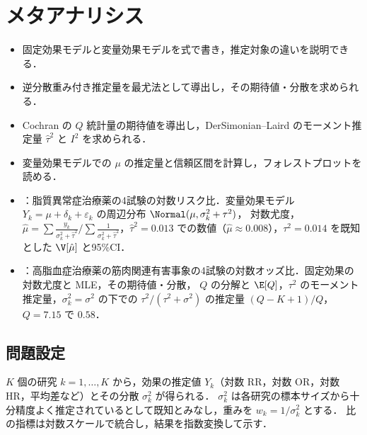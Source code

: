 \chapter{メタアナリシス}\label{ch:15}

\begin{goalbox}
\begin{itemize}
\item 固定効果モデルと変量効果モデルを式で書き，推定対象の違いを説明できる．
\item 逆分散重み付き推定量を最尤法として導出し，その期待値・分散を求められる．
\item Cochran の $Q$ 統計量の期待値を導出し，DerSimonian--Laird のモーメント推定量 $\hat\tau^2$ と $I^2$ を求められる．
\item 変量効果モデルでの $\mu$ の推定量と信頼区間を計算し，フォレストプロットを読める．
\end{itemize}
\end{goalbox}

\begin{exambox}
\begin{itemize}
\item {}：脂質異常症治療薬の4試験の対数リスク比．変量効果モデル $Y_k=\mu+\delta_k+\varepsilon_k$ の周辺分布 $\Normal(\mu,\sigma_k^2+\tau^2)$，
      対数尤度，$\hat\mu=\sum\frac{y_k}{\sigma_k^2+\hat\tau^2}\big/\sum\frac{1}{\sigma_k^2+\hat\tau^2}$，$\hat\tau^2=0.013$ での数値（$\hat\mu\approx0.008$），$\tau^2=0.014$ を既知とした $\V[\hat\mu]$ と95\%CI．
\item {}：高脂血症治療薬の筋肉関連有害事象の4試験の対数オッズ比．固定効果の対数尤度と MLE，その期待値・分散，
      $Q$ の分解と $\E[Q]$，$\tau^2$ のモーメント推定量，$\sigma_k^2=\sigma^2$ の下での $\tau^2/(\tau^2+\sigma^2)$ の推定量 $(Q-K+1)/Q$，$Q=7.15$ で $0.58$．
\end{itemize}
\end{exambox}


\section{問題設定}\label{sec:15-setting}
$K$ 個の研究 $k=1,\dots,K$ から，効果の推定値 $Y_k$（対数 RR，対数 OR，対数 HR，平均差など）とその分散 $\sigma_k^2$ が得られる．
$\sigma_k^2$ は各研究の標本サイズから十分精度よく推定されているとして既知とみなし，重みを $w_k=1/\sigma_k^2$ とする．
比の指標は対数スケールで統合し，結果を指数変換して示す．

